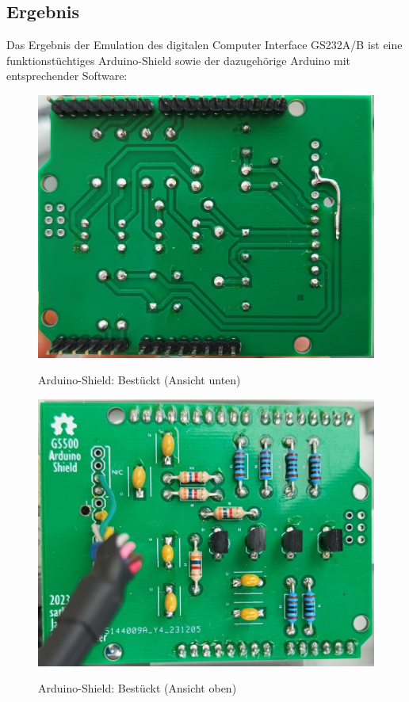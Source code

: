 \subsection{Ergebnis}
Das Ergebnis der Emulation des digitalen Computer Interface GS232A/B ist eine funktionstüchtiges Arduino-Shield sowie der dazugehörige Arduino mit entsprechender Software:
\begin{figure}[H]
	\begin{minipage}[b]{.4\linewidth} %
		\includegraphics[width=\linewidth]{../ref/PCB_Unten_GS232.jpeg}
		\label{fig:PCB_Arduino-Shield_unten_Bestueckt}
		\caption{Arduino-Shield: Bestückt (Ansicht unten)}
	\end{minipage}
	\hspace{.1\linewidth}%
	\begin{minipage}[b]{.4\linewidth} %
		\includegraphics[width=\linewidth]{../ref/PCB_Oben_02_GS232.jpeg}
		\label{fig:PCB_Arduino-Shield_oben_Bestueckt}
		\caption{Arduino-Shield: Bestückt (Ansicht oben)}
	\end{minipage}
\end{figure}

